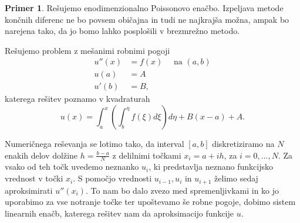 \documentclass[12pt,a4paper,twoside]{article}
\theoremstyle{definition} %
\newtheorem{primer}[definicija]{Primer}
\theoremstyle{plain} %
\numberwithin{equation}{section}
\begin{document}
\begin{primer}
\label{prim:fdm}
Rešujemo enodimenzionalno Poissonovo enačbo. Izpeljava metode končnih diferenc
ne bo povsem običajna in tudi ne najkrajša možna, ampak bo narejena tako, da
jo bomo lahko posplošili v brezmrežno metodo.

Rešujemo problem z mešanimi robnimi pogoji
\begin{align}
  u''(x) &= f(x) \quad \text{ na } (a, b) \nonumber \\
  u(a) &= A  \label{eq:example-prob} \\
  u'(b) &= B, \nonumber
\end{align}
katerega rešitev poznamo v kvadraturah
\[
  u(x) = \int_a^x\left(\int_b^\eta f(\xi) d\xi \right) d\eta + B(x-a) + A.
\]

Numeričnega reševanja se lotimo tako, da interval $[a, b]$ diskretiziramo na $N$ enakih delov
dolžine $h = \frac{b-a}{N}$ z delilnimi točkami $x_i = a + i h$, za $i = 0, \dots, N$. Za vsako od
teh točk uvedemo neznanko $u_i$, ki predstavlja neznano funkcijsko vrednost v točki $x_i$. S pomočjo
vrednosti $u_{i-1}, u_i$ in $u_{i+1}$ želimo sedaj aproksimirati $u''(x_i)$. To nam bo dalo zvezo
med spremenljivkami in ko jo uporabimo za vse notranje točke ter upoštevamo še robne pogoje, dobimo
sistem linearnih enačb, katerega rešitev nam da aproksimacijo funkcije $u$.


\end{primer}
\end{document}
